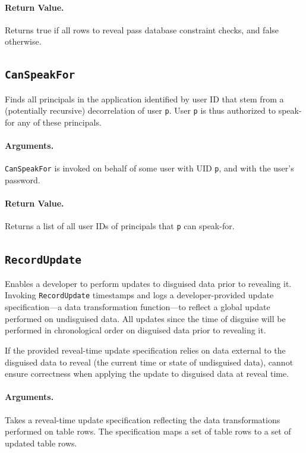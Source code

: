     \paragraph{Return Value.} 
    Returns true if all rows to reveal pass database constraint checks, and false otherwise.

\subsection{\texttt{CanSpeakFor}}
    Finds all principals in the application identified by user ID that stem from
    a (potentially recursive) decorrelation of user \texttt{p}.
    User \texttt{p} is thus authorized to speak-for any of these principals.

    \paragraph{Arguments.} 
    \texttt{CanSpeakFor} is invoked on behalf of some user with UID \texttt{p},
    and with the user's password.

    \paragraph{Return Value.} 
    Returns a list of all user IDs of principals that \texttt{p} can
    speak-for.

\subsection{\texttt{RecordUpdate}}
\label{s:semantics:updates}

Enables a developer to perform updates to disguised data prior to revealing it.
Invoking \texttt{RecordUpdate} timestamps and logs a developer-provided update
specification---a data transformation function---to reflect a global update
performed on undisguised data. All updates since the time of disguise will be
performed in chronological order on disguised data prior to revealing it.

If the provided reveal-time update specification relies on data external to the
disguised data to reveal (\eg the current time or state of undisguised data),
\sys cannot ensure correctness when applying the update to disguised data at
reveal time.

    \paragraph{Arguments.} Takes a reveal-time update specification reflecting
    the data transformations performed on table rows. The specification maps a
    set of table rows to a set of updated table rows.

